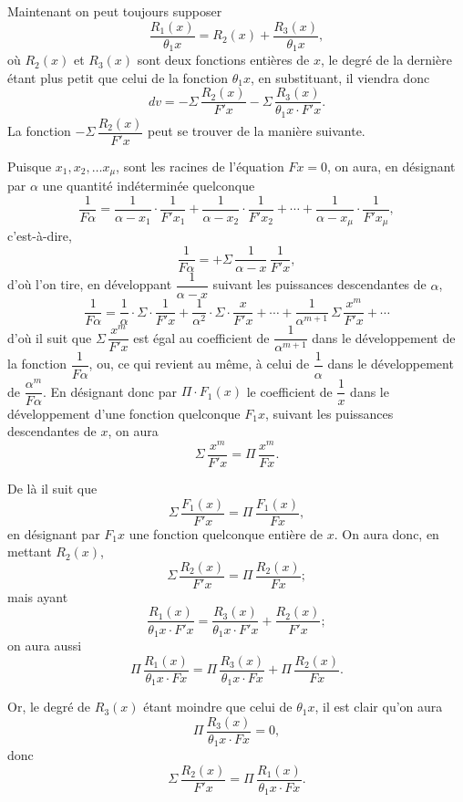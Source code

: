 \documentclass{article}
\begin{document}
Maintenant on peut toujours supposer
\[ \frac{R_1(x)}{\theta_1 x} = R_2(x) + \frac{R_3(x)}{\theta_1 x}, \]
où $R_2(x)$ et $R_3(x)$ sont deux fonctions entières de $x$, le degré de la dernière étant plus petit que celui de la fonction $\theta_1 x$, en substituant, il viendra donc
\[ dv = -\Sigma\,\frac{R_2(x)}{F' x} - \Sigma\,\frac{R_3(x)}{\theta_1 x \cdot F' x}. \tag{27} \]
La fonction $-\Sigma\,\dfrac{R_2(x)}{F' x}$ peut se trouver de la manière suivante.

Puisque $x_1, x_2, \ldots x_\mu$, sont les racines de l'équation $F x = 0$, on aura, en désignant par $\alpha$ une quantité indéterminée quelconque
\[ \frac{1}{F\alpha} = \frac{1}{\alpha - x_1} \cdot \frac{1}{F' x_1} + \frac{1}{\alpha - x_2} \cdot \frac{1}{F' x_2} + \cdots + \frac{1}{\alpha - x_\mu} \cdot \frac{1}{F' x_\mu}, \]
c'est-à-dire,
\[ \frac{1}{F\alpha} = +\Sigma\,\frac{1}{\alpha - x}\,\frac{1}{F' x}, \tag{28} \]
d'où l'on tire, en développant $\dfrac{1}{\alpha - x}$ suivant les puissances descendantes de $\alpha$,
\[ \frac{1}{F\alpha} = \frac{1}{\alpha} \cdot \Sigma \cdot \frac{1}{F' x} + \frac{1}{\alpha^{2}} \cdot \Sigma \cdot \frac{x}{F' x} + \cdots + \frac{1}{\alpha^{m+1}}\,\Sigma\,\frac{x^{m}}{F' x} + \cdots \]
d'où il suit que $\Sigma\,\dfrac{x^{m}}{F' x}$ est égal au coefficient de $\dfrac{1}{\alpha^{m+1}}$ dans le développement de la fonction $\dfrac{1}{F\alpha}$, ou, ce qui revient au même, à celui de $\dfrac{1}{\alpha}$ dans le développement de $\dfrac{\alpha^{m}}{F\alpha}$. En désignant donc par $\Pi \cdot F_1(x)$ le coefficient de $\dfrac{1}{x}$ dans le développement d'une fonction quelconque $F_1 x$, suivant les puissances descendantes de $x$, on aura
\[ \Sigma\,\frac{x^{m}}{F' x} = \Pi\,\frac{x^{m}}{F x}. \]

De là il suit que
\[ \Sigma\,\frac{F_1(x)}{F' x} = \Pi\,\frac{F_1(x)}{F x}, \]
en désignant par $F_1 x$ une fonction quelconque entière de $x$. On aura donc, en mettant $R_2(x)$,
\[ \Sigma\,\frac{R_2(x)}{F' x} = \Pi\,\frac{R_2(x)}{F x}; \tag{29} \]
mais ayant
\[ \frac{R_1(x)}{\theta_1 x \cdot F' x} = \frac{R_3(x)}{\theta_1 x \cdot F' x} + \frac{R_2(x)}{F' x}; \]
on aura aussi
\[ \Pi\,\frac{R_1(x)}{\theta_1 x \cdot F x} = \Pi\,\frac{R_3(x)}{\theta_1 x \cdot F x} + \Pi\,\frac{R_2(x)}{F x}. \]

Or, le degré de $R_3(x)$ étant moindre que celui de $\theta_1 x$, il est clair qu'on aura
\[ \Pi\,\frac{R_3(x)}{\theta_1 x \cdot F x} = 0, \]
donc
\[ \Sigma\,\frac{R_2(x)}{F' x} = \Pi\,\frac{R_1(x)}{\theta_1 x \cdot F x}. \]
\end{document}
